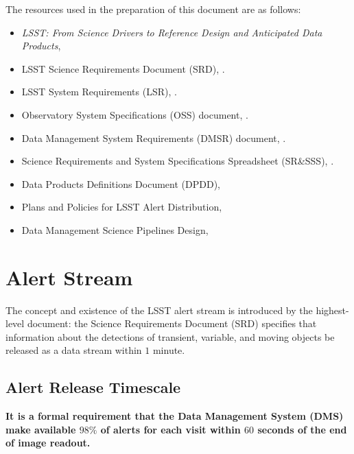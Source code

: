 \documentclass[DM,authoryear,toc]{lsstdoc}
\begin{document}
The resources used in the preparation of this document are as follows:
\begin{itemize}
\item {\it LSST: From Science Drivers to Reference Design and Anticipated Data Products}, \citet{2008arXiv0805.2366I}
\item LSST Science Requirements Document (SRD), .
\item LSST System Requirements (LSR), .
\item Observatory System Specifications (OSS) document, .
\item Data Management System Requirements (DMSR) document, .
\item Science Requirements and System Specifications Spreadsheet (SR\&SSS), .
\item Data Products Definitions Document (DPDD), 
\item Plans and Policies for LSST Alert Distribution, 
\item Data Management Science Pipelines Design, 
\end{itemize}

\section{Alert Stream} \label{sec:alerts}

The concept and existence of the LSST alert stream is introduced by the highest-level document: the Science Requirements Document (SRD) specifies that information about the detections of transient, variable, and moving objects be released as a data stream within $1$ minute. 

\subsection{Alert Release Timescale}\label{ssec:OTT1}

{\bf It is a formal requirement that the Data Management System (DMS) make available $98\%$ of alerts for each visit within $60$ seconds of the end of image readout.}
\end{document}
